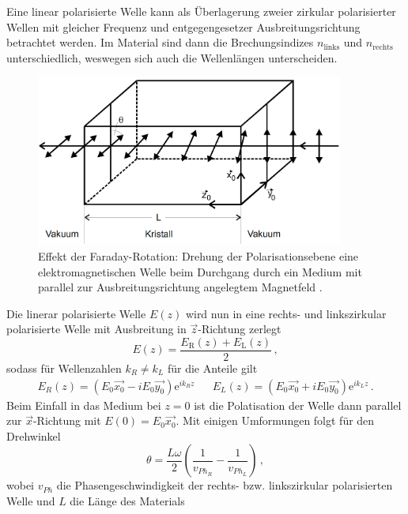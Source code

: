 Eine linear polarisierte Welle kann als Überlagerung zweier zirkular polarisierter Wellen mit gleicher Frequenz
und entgegengesetzer Ausbreitungsrichtung betrachtet werden. Im Material sind dann die Brechungsindizes $n_\text{links}$ 
und $n_\text{rechts}$ unterschiedlich, weswegen sich auch die Wellenlängen unterscheiden.
\FloatBarrier
\begin{figure}[h]
    \centering
    \includegraphics[width=0.9\textwidth]{rotation.png}
    \caption{Effekt der Faraday-Rotation: Drehung der Polarisationsebene eine elektromagnetischen Welle beim Durchgang durch ein Medium mit parallel zur Ausbreitungsrichtung angelegtem Magnetfeld \cite{quelle02}.}
    \label{fig:tfig2}
\end{figure}
\FloatBarrier
\noindent
Die linerar polarisierte Welle $E(z)$ wird nun in eine rechts- und linkszirkular polarisierte Welle mit Ausbreitung in 
$\vec{z}$-Richtung zerlegt
\begin{equation*}
    E(z) = \frac{E_\text{R}\left(z\right) + E_\text{L}\left(z\right)}{2} \, ,
\end{equation*}
sodass für Wellenzahlen $k_R \neq k_L$ für die Anteile gilt
\begin{align*}
    E_R (z) = \left(E_0 \vec{x_0} - i E_0 \vec{y_0}\right) \text{e}^{i k_R z} && E_L (z) = \left(E_0 \vec{x_0} + i E_0 \vec{y_0}\right) \text{e}^{i k_L z} \, .
\end{align*}
Beim Einfall in das Medium bei $z = 0$ ist die Polatisation der Welle dann parallel zur $\vec{x}$-Richtung mit $E(0) = E_0 \vec{x_0}$.
Mit einigen Umformungen folgt für den Drehwinkel
\begin{equation*}
    \theta = \frac{L \omega}{2} \left(\frac{1}{v_{Ph_R}} - \frac{1}{v_{Ph_L}}\right) \, ,
\end{equation*}
wobei $v_{Ph}$ die Phasengeschwindigkeit der rechts- bzw. linkszirkular polarisierten Welle und $L$ die Länge des Materials
